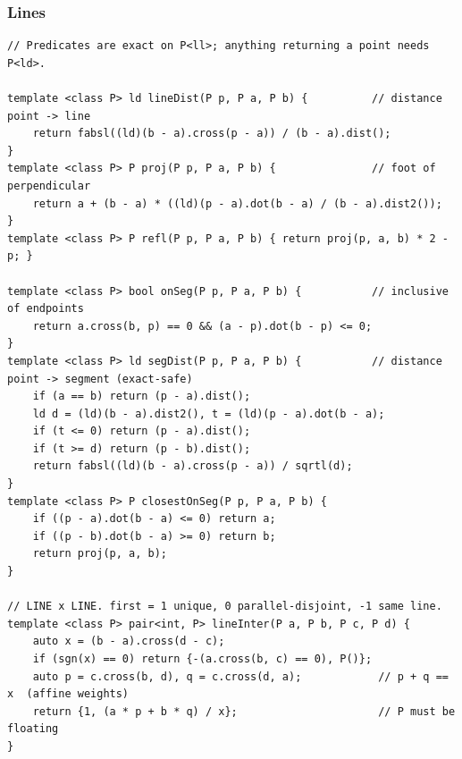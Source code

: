 \documentclass[9pt,a4paper,twocolumn]{extarticle}
\begin{document}
\filbreak
\subsubsection{Lines}
\nopagebreak
\begin{lstlisting}
// Predicates are exact on P<ll>; anything returning a point needs P<ld>.

template <class P> ld lineDist(P p, P a, P b) {          // distance point -> line
    return fabsl((ld)(b - a).cross(p - a)) / (b - a).dist();
}
template <class P> P proj(P p, P a, P b) {               // foot of perpendicular
    return a + (b - a) * ((ld)(p - a).dot(b - a) / (b - a).dist2());
}
template <class P> P refl(P p, P a, P b) { return proj(p, a, b) * 2 - p; }

template <class P> bool onSeg(P p, P a, P b) {           // inclusive of endpoints
    return a.cross(b, p) == 0 && (a - p).dot(b - p) <= 0;
}
template <class P> ld segDist(P p, P a, P b) {           // distance point -> segment (exact-safe)
    if (a == b) return (p - a).dist();
    ld d = (ld)(b - a).dist2(), t = (ld)(p - a).dot(b - a);
    if (t <= 0) return (p - a).dist();
    if (t >= d) return (p - b).dist();
    return fabsl((ld)(b - a).cross(p - a)) / sqrtl(d);
}
template <class P> P closestOnSeg(P p, P a, P b) {
    if ((p - a).dot(b - a) <= 0) return a;
    if ((p - b).dot(b - a) >= 0) return b;
    return proj(p, a, b);
}

// LINE x LINE. first = 1 unique, 0 parallel-disjoint, -1 same line.
template <class P> pair<int, P> lineInter(P a, P b, P c, P d) {
    auto x = (b - a).cross(d - c);
    if (sgn(x) == 0) return {-(a.cross(b, c) == 0), P()};
    auto p = c.cross(b, d), q = c.cross(d, a);            // p + q == x  (affine weights)
    return {1, (a * p + b * q) / x};                      // P must be floating
}


\end{lstlisting}
\end{document}
